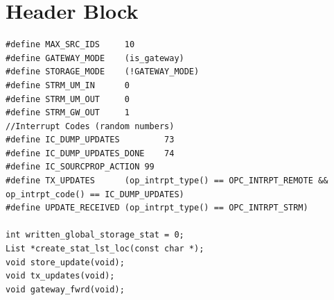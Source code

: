 \section{Header Block}
{\tiny
\begin{verbatim}
#define MAX_SRC_IDS		10
#define GATEWAY_MODE	(is_gateway)
#define STORAGE_MODE	(!GATEWAY_MODE)
#define STRM_UM_IN		0
#define STRM_UM_OUT		0
#define STRM_GW_OUT		1
//Interrupt Codes (random numbers)
#define IC_DUMP_UPDATES 		73
#define IC_DUMP_UPDATES_DONE 	74
#define IC_SOURCPROP_ACTION 99
#define TX_UPDATES 		(op_intrpt_type() == OPC_INTRPT_REMOTE && op_intrpt_code() == IC_DUMP_UPDATES)
#define UPDATE_RECEIVED	(op_intrpt_type() == OPC_INTRPT_STRM)

int written_global_storage_stat = 0;
List *create_stat_lst_loc(const char *);
void store_update(void);
void tx_updates(void);
void gateway_fwrd(void);
\end{verbatim}
}

